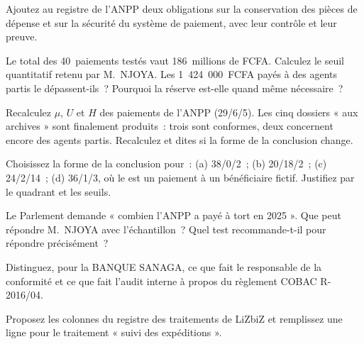 \begin{boxexo}[title={\ding{45}\quad Exercice~25.2. Le registre \niveaubase}]
Ajoutez au registre de l'ANPP deux obligations sur la conservation des
pièces de dépense et sur la sécurité du système de paiement, avec leur
contrôle et leur preuve.
\end{boxexo}

\begin{boxexo}[title={\ding{45}\quad Exercice~25.3. Le seuil \niveaumoyen}]
Le total des 40~paiements testés vaut 186~millions de FCFA. Calculez le
seuil quantitatif retenu par M.~NJOYA. Les 1~424~000~FCFA payés à des agents
partis le dépassent-ils~? Pourquoi la réserve est-elle quand même
nécessaire~?
\end{boxexo}

\begin{boxexo}[title={\ding{45}\quad Exercice~25.4. Recalculer la lecture \niveaumoyen}]
Recalculez $\mu$, $U$ et $H$ des paiements de l'ANPP (29/6/5). Les cinq
dossiers « aux archives » sont finalement produits~: trois sont conformes,
deux concernent encore des agents partis. Recalculez et dites si la forme
de la conclusion change.
\end{boxexo}

\begin{boxexo}[title={\ding{45}\quad Exercice~25.5. La forme de la conclusion \niveaumoyen}]
Choisissez la forme de la conclusion pour~: (a) 38/0/2~; (b) 20/18/2~; (c)
24/2/14~; (d) 36/1/3, où le \NON{} est un paiement à un bénéficiaire
fictif. Justifiez par le quadrant et les seuils.
\end{boxexo}

\begin{boxexo}[title={\ding{45}\quad Exercice~25.6. Projeter ou non \niveaumoyen}]
Le Parlement demande « combien l'ANPP a payé à tort en 2025 ». Que peut
répondre M.~NJOYA avec l'échantillon~? Quel test recommande-t-il pour
répondre précisément~?
\end{boxexo}

\begin{boxexo}[title={\ding{45}\quad Exercice~25.7. La fonction conformité \niveaubase}]
Distinguez, pour la BANQUE SANAGA, ce que fait le responsable de la
conformité et ce que fait l'audit interne à propos du règlement COBAC
R-2016/04.
\end{boxexo}

\begin{boxexo}[title={\ding{45}\quad Exercice~25.8. Le registre des traitements \niveaumoyen}]
Proposez les colonnes du registre des traitements de LiZbiZ et remplissez
une ligne pour le traitement « suivi des expéditions ».
\end{boxexo}

